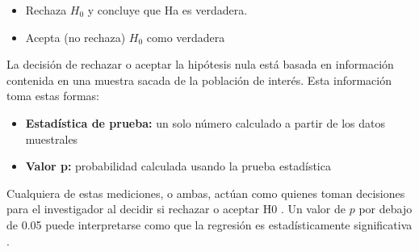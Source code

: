 \begin{itemize}
    \item Rechaza $H_0$ y concluye que Ha es verdadera.
    \item Acepta (no rechaza) $H_0$ como verdadera
\end{itemize}

La decisión de rechazar o aceptar la hipótesis nula está basada en información contenida en una muestra sacada de la población de interés. Esta información toma estas formas:

\begin{itemize}
    \item \textbf{Estadística de prueba:} un solo número calculado a partir de los datos muestrales
    \item \textbf{Valor p:} probabilidad calculada usando la prueba estadística
\end{itemize}

Cualquiera de estas mediciones, o ambas, actúan como quienes toman decisiones para el investigador al decidir si rechazar o aceptar H0 \cite{mendehall}. Un valor de $p$ por debajo de 0.05 puede interpretarse como que la regresión es estadísticamente significativa \cite{daroczi}.
